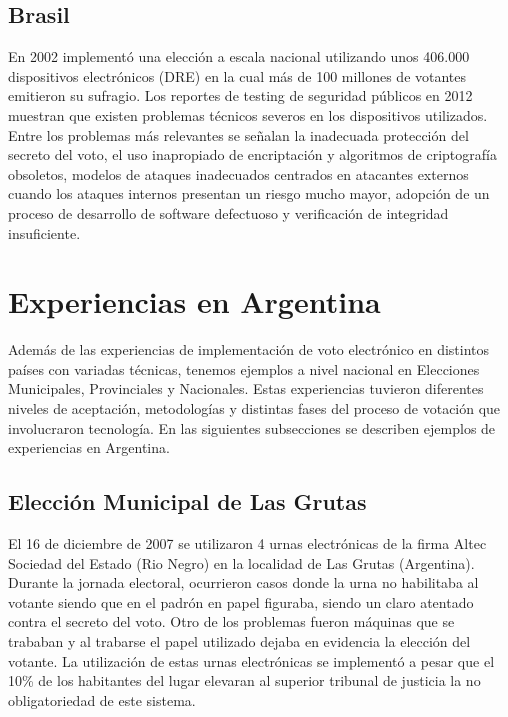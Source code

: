 \subsection{Brasil}
En 2002 implementó una elección a escala nacional utilizando unos 406.000 dispositivos electrónicos (DRE) en la cual más de 100 millones de votantes emitieron su sufragio. Los reportes de testing de seguridad públicos en 2012 muestran que existen problemas técnicos severos en los dispositivos utilizados. Entre los problemas más relevantes se señalan la inadecuada protección del secreto del voto, el uso inapropiado de encriptación y algoritmos de criptografía obsoletos, modelos de ataques inadecuados centrados en atacantes externos cuando los ataques internos presentan un riesgo mucho mayor, adopción de un proceso de desarrollo de software defectuoso y verificación de integridad insuficiente.\cite{brunazo2005voto}

\section{Experiencias en Argentina}
Además de las experiencias de implementación de voto electrónico en distintos países con variadas técnicas, tenemos ejemplos a nivel nacional en Elecciones Municipales, Provinciales y Nacionales. Estas experiencias tuvieron diferentes niveles de aceptación, metodologías y distintas fases del proceso de votación que involucraron tecnología. En las siguientes subsecciones se describen ejemplos de experiencias en Argentina.

\subsection{Elección Municipal de Las Grutas}
El 16 de diciembre de 2007 se utilizaron 4 urnas electrónicas de la firma Altec Sociedad del Estado (Rio Negro) en la localidad de Las Grutas (Argentina). Durante la jornada electoral, ocurrieron casos donde la urna no habilitaba al votante siendo que en el padrón en papel figuraba, siendo un claro atentado contra el secreto del voto. Otro de los problemas fueron máquinas que se trababan y al trabarse el papel utilizado dejaba en evidencia la elección del votante. La utilización de estas urnas electrónicas se implementó a pesar que el 10\% de los habitantes del lugar elevaran al superior tribunal de justicia la no obligatoriedad de este sistema. \cite{eleccionesLasGrutas}

